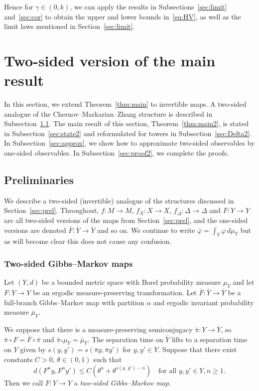 \documentclass[10pt]{amsart}
\theoremstyle{definition}\newtheorem{defi}[theo]{Definition}\newtheorem{rema}[theo]{Remark}\newtheorem{exam}[theo]{Example}\newtheorem{exem}[theo]{Example}\newtheorem{nota}[theo]{Notation}
\newcommand{\bY}{\bar{Y}}
\newcommand{\bF}{\bar{F}}
\newcommand{\bvarphi}{\bar{\varphi}}
\begin{document}
Hence for $\gamma\in(0,k)$, we can apply the results in Subsections~\ref{sec:limit} and~\ref{sec:cor} to obtain the upper and lower bounds in~\eqref{eq:HV}, as well as the limit laws mentioned in Section~\ref{sec:limit}.


\section{Two-sided version of the main result}\label{sec:main2}

In this section, we extend Theorem~\ref{thm:main} to invertible maps. A two-sided analogue of the Chernov--Markarian--Zhang structure is described in Subsection~\ref{sec:prel2}. The main result of this section, Theorem~\ref{thm:main2}, is stated in Subsection~\ref{sec:state2} and reformulated for towers in Subsection~\ref{sec:Delta2}. In Subsection~\ref{sec:approx}, we show how to approximate two-sided observables by one-sided observables. In Subsection~\ref{sec:proof2}, we complete the proofs.


\subsection{Preliminaries}\label{sec:prel2}

We describe a two-sided (invertible) analogue of the structures discussed in Section~\ref{sec:prel}. Throughout, $f:M\to M$, $f_X:X\to X$, $f_\Delta:\Delta\to\Delta$ and $F:Y\to Y$ are all two-sided versions of the maps from Section~\ref{sec:prel}, and the one-sided versions are denoted $\bF:\bY\to\bY$ and so on. We continue to write $\bvarphi=\int_Y\varphi\,d\mu_Y$ but as will become clear this does not cause any confusion.

\subsubsection*{Two-sided Gibbs--Markov maps}

Let $(Y,d)$ be a bounded metric space with Borel probability measure $\mu_Y$ and let $F:Y\to Y$ be an ergodic measure-preserving transformation. Let $\bF:\bY\to\bY$ be a full-branch Gibbs--Markov map with partition $\alpha$ and ergodic invariant probability measure $\bar\mu_Y$.

We suppose that there is a measure-preserving semiconjugacy $\bar\pi:Y\to\bY$, so $\bar\pi\circ F=\bF\circ\bar\pi$ and $\bar\pi_*\mu_Y=\bar\mu_Y$. The separation time on $\bY$ lifts to a separation time on $Y$ given by $s(y,y')=s(\bar\pi y,\bar\pi y')$ for $y,y'\in Y$. Suppose that there exist constants $C>0$, $\theta\in(0,1)$ such that
\begin{equation}\label{eq:prod}
d\left(F^ny,F^ny'\right)\le C\left(\theta^n+\theta^{s(y,\,y')-n}\right)
\quad\text{for all }y,y'\in Y, n\ge1.
\end{equation}
Then we call $F:Y\to Y$ a \emph{two-sided Gibbs--Markov map}.
\end{document}
